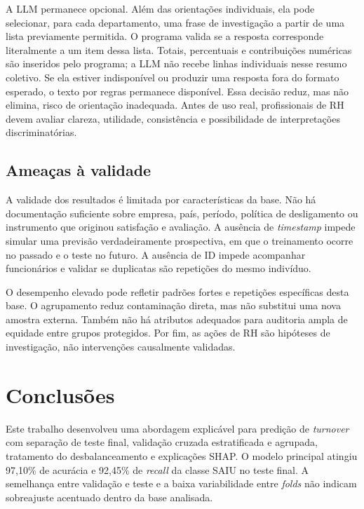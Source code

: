 \documentclass[12pt]{article}
\begin{document}
A LLM permanece opcional. Além das orientações individuais, ela pode selecionar, para cada departamento, uma frase de investigação a partir de uma lista previamente permitida. O programa valida se a resposta corresponde literalmente a um item dessa lista. Totais, percentuais e contribuições numéricas são inseridos pelo programa; a LLM não recebe linhas individuais nesse resumo coletivo. Se ela estiver indisponível ou produzir uma resposta fora do formato esperado, o texto por regras permanece disponível. Essa decisão reduz, mas não elimina, risco de orientação inadequada. Antes de uso real, profissionais de RH devem avaliar clareza, utilidade, consistência e possibilidade de interpretações discriminatórias.

\subsection{Ameaças à validade}

A validade dos resultados é limitada por características da base. Não há documentação suficiente sobre empresa, país, período, política de desligamento ou instrumento que originou satisfação e avaliação. A ausência de \textit{timestamp} impede simular uma previsão verdadeiramente prospectiva, em que o treinamento ocorre no passado e o teste no futuro. A ausência de ID impede acompanhar funcionários e validar se duplicatas são repetições do mesmo indivíduo.

O desempenho elevado pode refletir padrões fortes e repetições específicas desta base. O agrupamento reduz contaminação direta, mas não substitui uma nova amostra externa. Também não há atributos adequados para auditoria ampla de equidade entre grupos protegidos. Por fim, as ações de RH são hipóteses de investigação, não intervenções causalmente validadas.

\section{Conclusões}
\label{sec:conclusoes}

Este trabalho desenvolveu uma abordagem explicável para predição de \textit{turnover} com separação de teste final, validação cruzada estratificada e agrupada, tratamento do desbalanceamento e explicações SHAP. O modelo principal atingiu 97,10\% de acurácia e 92,45\% de \textit{recall} da classe SAIU no teste final. A semelhança entre validação e teste e a baixa variabilidade entre \textit{folds} não indicam sobreajuste acentuado dentro da base analisada.
\end{document}
